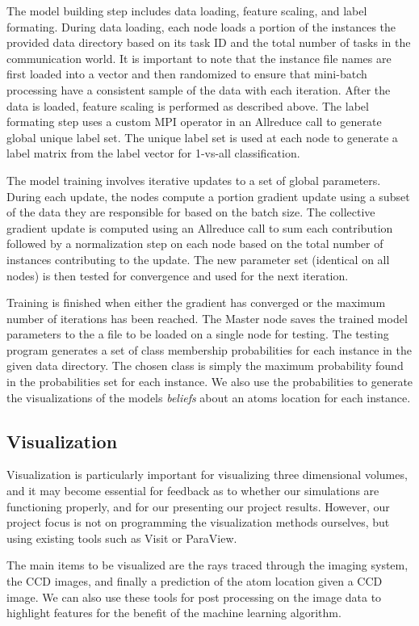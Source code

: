 The model building step includes data loading, feature scaling, and label formating. During data loading, each node loads a portion of the instances the provided data directory based on its task ID and the total number of tasks in the communication world.  It is important to note that the instance file names are first loaded into a vector and then randomized to ensure that mini-batch processing have a consistent sample of the data with each iteration.  After the data is loaded, feature scaling is performed as described above.  The label formating step uses a custom MPI operator in an Allreduce call to generate global unique label set.  The unique label set is used at each node to generate a label matrix from the label vector for 1-vs-all classification.

The model training involves iterative updates to a set of global parameters.  During each update, the nodes compute a portion gradient update using a subset of the data they are responsible for based on the batch size.  The collective gradient update is computed using an Allreduce call to sum each contribution followed by a normalization step on each node based on the total number of instances contributing to the update.  The new parameter set (identical on all nodes) is then tested for convergence and used for the next iteration.

Training is finished when either the gradient has converged or the maximum number of iterations has been reached.  The Master node saves the trained model parameters to the a file to be loaded on a single node for testing.  The testing program generates a set of class membership probabilities for each instance in the given data directory.  The chosen class is simply the maximum probability found in the probabilities set for each instance.  We also use the probabilities to generate the visualizations of the models \emph{beliefs} about an atoms location for each instance.

\subsection{Visualization}
Visualization is particularly important for visualizing three dimensional volumes, and it may become essential for feedback as to whether our simulations are functioning properly, and for our presenting our project results. However, our project focus is not on programming the visualization methods ourselves, but using existing tools such as Visit or ParaView.

The main items to be visualized are the rays traced through the imaging system, the CCD images, and finally a prediction of the atom location given a CCD image. We can also use these tools for post processing on the image data to highlight features for the benefit of the machine learning algorithm.